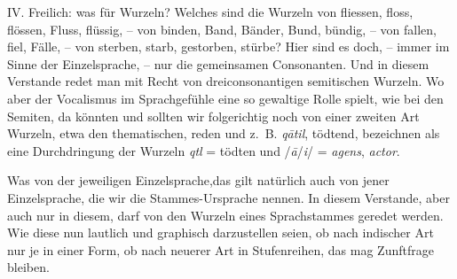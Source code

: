 {IV. Freilich: was für Wurzeln? Welches sind die Wurzeln von fliessen, floss, flössen, Fluss, flüssig, – von binden, Band, Bänder, Bund, bündig, – von fallen, fiel, Fälle, – von sterben,  starb, gestorben, stürbe? Hier sind es doch, – immer im Sinne der Einzelsprache, – nur die gemeinsamen Consonanten. Und in diesem Verstande redet man mit Recht von dreiconsonantigen semitischen Wurzeln. Wo aber der Vocalismus im Sprachgefühle eine so gewaltige Rolle spielt, wie bei den Semiten, da könnten und sollten wir \label{sp.296} folgerichtig noch von einer zweiten Art Wurzeln, etwa den thematischen, reden und z.~B. \textit{qātil}, tödtend, bezeichnen als eine Durchdringung der Wurzeln \textit{qtl} = tödten und /\textit{ā}/\textit{i}/ = \textit{agens}, \textit{actor}.


 Was von der jeweiligen Einzelsprache,das gilt natürlich auch von jener Einzelsprache, die wir die Stammes-Ursprache nennen. In diesem Verstande, aber auch nur in diesem, darf von den Wurzeln eines Sprachstammes geredet werden. Wie diese nun lautlich und graphisch darzustellen seien, ob nach indischer Art nur je in einer Form, ob nach neuerer Art in Stufenreihen, das mag Zunftfrage bleiben.

}
